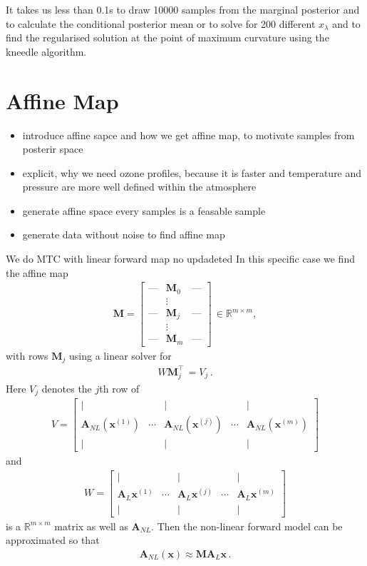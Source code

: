 It takes us less than 0.1s to draw 10000 samples from the marginal posterior and to calculate the conditional posterior mean or to solve for 200 different $x_{\lambda}$ and to find the regularised solution at the point of maximum curvature using the kneedle algorithm.\\


\section{Affine Map}
\begin{itemize}
	\item introduce affine sapce and how we get affine map, to motivate samples from posterir space
	\item explicit, why we need ozone profiles, because it is faster and temperature and pressure are more well defined within the atmosphere
	\item generate affine space every samples is a feasable sample
	\item generate data without noise to find affine map
\end{itemize}
We do MTC with linear forward map no updadeted
In this specific case we find the affine map
\begin{align}
	\bm{M} = \begin{bmatrix}
		\text{---} & \bm{M}_0 &   \text{---}  \\
		&  \vdots  & \\
		\text{---}& \bm{M}_j &  \text{---} \\
		&  \vdots  & \\
		\text{---} & \bm{M}_m &   \text{---}
	\end{bmatrix} \, \in \mathbb{R}^{m \times m} ,
\end{align}
with rows $\bm{M}_j$ using a linear solver for
\begin{align}
	W \bm{M}_j^\top \, = V_{j} \, .
\end{align}
Here $V_j$ denotes the $j$th row of  
\begin{align}
	V = \begin{bmatrix}
		\vert&   &  \vert & & \vert \\
		\bm{A}_{NL} (\bm{x}^{(1)} ) &  \cdots& \bm{A}_{NL} (\bm{x}^{(j)} )&  \cdots & \bm{A}_{NL} (\bm{x}^{(m)})  \\
		\vert&   &  \vert & & \vert 
	\end{bmatrix}
\end{align}
and
\begin{align}
	W = \begin{bmatrix}
		\vert&   &  \vert & & \vert \\
		\bm{A}_{L} \bm{x}^{(1)} &  \cdots& \bm{A}_{L} \bm{x}^{(j)} &  \cdots & \bm{A}_{L} \bm{x}^{(m)} \\
		\vert&   &  \vert & & \vert 
	\end{bmatrix}
\end{align}
is a $\mathbb{R}^{m \times m} $ matrix as well as $\bm{A}_{NL}$.
Then the non-linear forward model can be approximated so that
\begin{align}
	\bm{A}_{NL}(\bm{x}) \approx \bm{M A}_L \bm{x}\, .
\end{align}

